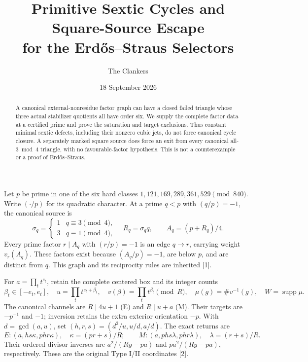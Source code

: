 \documentclass[11pt,reqno]{amsart}
\title[Primitive sextic cycles and square-source escape]{Primitive Sextic Cycles and Square-Source Escape\\for the Erd\H{o}s--Straus Selectors}
\author{The Clankers}\date{18 September 2026}
\begin{document}
\begin{abstract}
A canonical external-nonresidue factor graph can have a closed failed triangle
whose three actual stabilizer quotients all have order six. We supply the complete
factor data at a certified prime and prove the saturation and target exclusions.
Thus constant minimal sextic defects, including their nonzero cubic jets, do not
force canonical cycle closure. A separately marked square source does force an
exit from every canonical all-$3\bmod4$ triangle, with no favourable-factor
hypothesis. This is not a counterexample or a proof of Erd\H{o}s--Straus.
\end{abstract}\maketitle

Let $p$ be prime in one of the six hard classes
$1,121,169,289,361,529\pmod{840}$. Write $(\cdot/p)$ for its quadratic character.
At a prime $q<p$ with $(q/p)=-1$, the canonical source is
\[
 \sigma_q=\begin{cases}1&q\equiv3\pmod4,\\3&q\equiv1\pmod4,\end{cases}
 \quad R_q=\sigma_qq,\qquad A_q=(p+R_q)/4.
\]
Every prime factor $r\mid A_q$ with $(r/p)=-1$ is an edge $q\to r$, carrying
weight $v_r(A_q)$. These factors exist because $(A_q/p)=-1$, are below $p$, and
are distinct from $q$. This graph and its reciprocity rules are inherited [1].

For $a=\prod_t t^{e_t}$, retain the complete centered box and its integer counts
\[
 \beta_t\in[-e_t,e_t],\quad u=\prod_t t^{e_t+\beta_t},\quad
 v(\beta)=\prod_t t^{\beta_t}\pmod R,\quad
 \mu(g)=\#v^{-1}(g),\quad W=\operatorname{supp}\mu.
\]
The canonical channels are $R\mid4u+1$ (E) and $R\mid u+a$ (M). Their targets
are $-p^{-1}$ and $-1$; inversion retains the extra exterior orientation $-p$.
With $d=\gcd(a,u)$, set $(h,r,s)=(d^2/u,u/d,a/d)$. The exact returns are
\[
 E:(a,hs\kappa,phr\kappa),\quad \kappa=(pr+s)/R;
 \qquad M:(a,phs\lambda,phr\lambda),\quad\lambda=(r+s)/R. \tag{1}
\]
Their ordered divisor inverses are $a^2/(Ry-pa)$ and $pa^2/(Ry-pa)$, respectively.
These are the original Type I/II coordinates [2].
\end{document}
